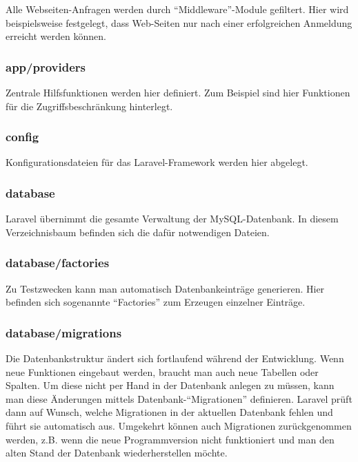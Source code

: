 Alle Webseiten-Anfragen werden durch "`Middleware"'-Module gefiltert. Hier wird beispielsweise festgelegt, dass Web-Seiten nur nach einer erfolgreichen Anmeldung erreicht werden können.

\subsubsection{app/providers}

Zentrale Hilfsfunktionen werden hier definiert. Zum Beispiel sind hier Funktionen für die Zugriffsbeschränkung hinterlegt.

\subsubsection{config}

Konfigurationsdateien für das Laravel-Framework werden hier abgelegt.

\subsubsection{database}

Laravel übernimmt die gesamte Verwaltung der MySQL-Datenbank. In diesem Verzeichnisbaum befinden sich die dafür notwendigen Dateien.

\subsubsection{database/factories}

Zu Testzwecken kann man automatisch Datenbankeinträge generieren. Hier befinden sich sogenannte "`Factories"' zum Erzeugen einzelner Einträge.

\subsubsection{database/migrations}

Die Datenbankstruktur ändert sich fortlaufend während der Entwicklung. Wenn neue Funktionen eingebaut werden, braucht man auch neue Tabellen oder Spalten. Um diese nicht per Hand in der Datenbank anlegen zu müssen, kann man diese Änderungen mittels Datenbank-"`Migrationen"' definieren. Laravel prüft dann auf Wunsch, welche Migrationen in der aktuellen Datenbank fehlen und führt sie automatisch aus. Umgekehrt können auch Migrationen zurückgenommen werden, z.B. wenn die neue Programmversion nicht funktioniert und man den alten Stand der Datenbank wiederherstellen möchte.

